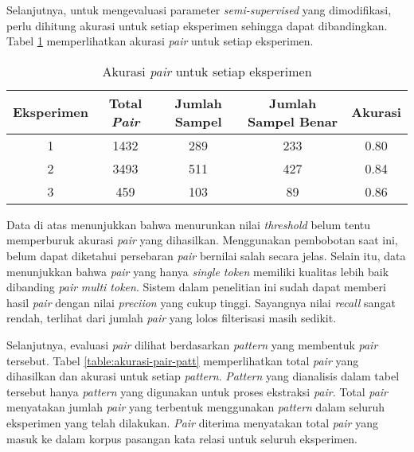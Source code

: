 Selanjutnya, untuk mengevaluasi parameter \textit{semi-supervised} yang dimodifikasi, perlu dihitung akurasi untuk setiap eksperimen sehingga dapat dibandingkan. Tabel \ref{table:akurasi-all} memperlihatkan akurasi \textit{pair} untuk setiap eksperimen.

\begin{table}
  \centering
  \caption{Akurasi \textit{pair} untuk setiap eksperimen}
  \label{table:akurasi-all}
  \begin{tabular}{|c|c|c|c|c|}
  \hline
  Eksperimen & Total \textit{Pair} & Jumlah Sampel & Jumlah Sampel Benar & Akurasi \\ \hline
  1 & 1432 & 289 & 233 & 0.80 \\ \hline
  2 & 3493 & 511 & 427 & 0.84 \\ \hline
  3 & 459  & 103 & 89  & 0.86 \\ \hline
  \end{tabular} 
\end{table}

Data di atas menunjukkan bahwa menurunkan nilai \textit{threshold} belum tentu memperburuk akurasi \textit{pair} yang dihasilkan. Menggunakan pembobotan saat ini, belum dapat diketahui persebaran \textit{pair} bernilai salah secara jelas. Selain itu, data menunjukkan bahwa \textit{pair} yang hanya \textit{single token} memiliki kualitas lebih baik dibanding \textit{pair} \textit{multi token}. Sistem dalam penelitian ini sudah dapat memberi hasil \textit{pair} dengan nilai \textit{preciion} yang cukup tinggi. Sayangnya nilai \textit{recall} sangat rendah, terlihat dari jumlah \textit{pair} yang lolos filterisasi masih sedikit.

Selanjutnya, evaluasi \textit{pair} dilihat berdasarkan \textit{pattern} yang membentuk \textit{pair} tersebut. Tabel \ref{table:akurasi-pair-patt} memperlihatkan total \textit{pair} yang dihasilkan dan akurasi untuk setiap \textit{pattern}. \textit{Pattern} yang dianalisis dalam tabel tersebut hanya \textit{pattern} yang digunakan untuk proses ekstraksi \textit{pair}. Total \textit{pair} menyatakan jumlah \textit{pair} yang terbentuk menggunakan \textit{pattern} dalam seluruh eksperimen yang telah dilakukan. \textit{Pair} diterima menyatakan total \textit{pair} yang masuk ke dalam korpus pasangan kata relasi untuk seluruh eksperimen.

